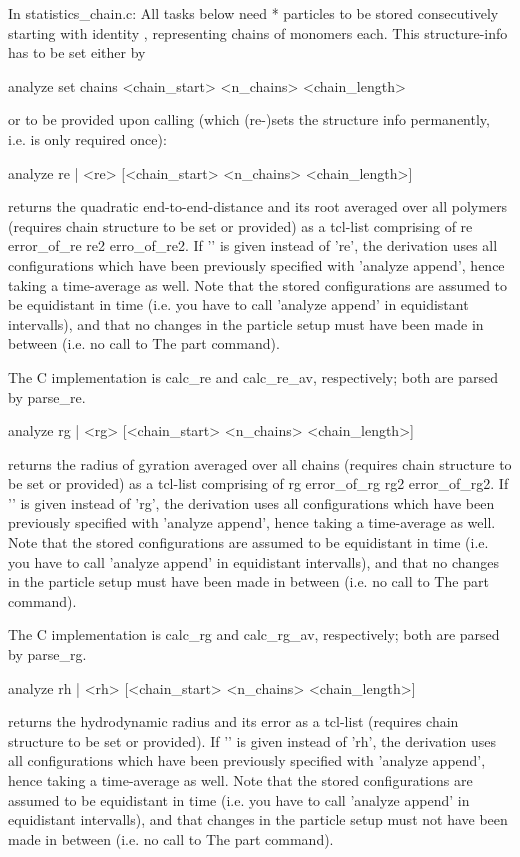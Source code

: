 {In statistics\_chain.c:
All tasks below need * particles to be stored consecutively starting with identity , representing  chains of  monomers each. This structure-info has to be set either by
\begin{tclcode}
 analyze set chains <chain_start> <n_chains> <chain_length> 
\end{tclcode}
or to be provided upon calling (which (re-)sets the structure info permanently, i.e. is only required once):
\begin{tclcode}
 analyze { re | <re> } [<chain_start> <n_chains> <chain_length>] 
\end{tclcode}
returns the quadratic end-to-end-distance and its root averaged over all polymers (requires chain structure to be set or provided) as a tcl-list comprising of re error\_of\_re re2 erro\_of\_re2.
If '' is given instead of 're', the derivation uses all configurations which have been previously specified with 'analyze append', hence taking a time-average as well. Note that the stored configurations are assumed to be equidistant in time (i.e. you have to call 'analyze append' in equidistant intervalls), and that no changes in the particle setup must have been made in between (i.e. no call to The part command).

The C implementation is calc\_re and calc\_re\_av, respectively; both are parsed by parse\_re.

\begin{tclcode}
 analyze { rg | <rg> } [<chain_start> <n_chains> <chain_length>] 
\end{tclcode}
returns the radius of gyration averaged over all chains (requires chain structure to be set or provided) as a tcl-list comprising of rg error\_of\_rg rg2 error\_of\_rg2.
If '' is given instead of 'rg', the derivation uses all configurations which have been previously specified with 'analyze append', hence taking a time-average as well. Note that the stored configurations are assumed to be equidistant in time (i.e. you have to call 'analyze append' in equidistant intervalls), and that no changes in the particle setup must have been made in between (i.e. no call to The part command).

The C implementation is calc\_rg and calc\_rg\_av, respectively; both are parsed by parse\_rg.

\begin{tclcode}
 analyze { rh | <rh> } [<chain_start> <n_chains> <chain_length>] 
\end{tclcode}
returns the hydrodynamic radius and its error as a tcl-list (requires chain structure to be set or provided). If '' is given instead of 'rh', the derivation uses all configurations which have been previously specified with 'analyze append', hence taking a time-average as well. Note that the stored configurations are assumed to be equidistant in time (i.e. you have to call 'analyze append' in equidistant intervalls), and that changes in the particle setup must not have been made in between (i.e. no call to The part command).

}
